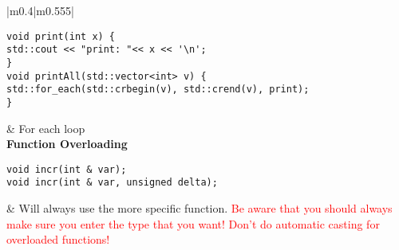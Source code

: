 \documentclass[main.tex,fontsize=8pt,paper=a4,paper=portrait,DIV=calc,]{scrartcl}
\begin{document}
\begin{table}[h!]
\begin{tabular}{|m{0.4\linewidth}|m{0.555\linewidth}|}
\hline
\begin{lstlisting}
void print(int x) {
std::cout << "print: "<< x << '\n';
}
void printAll(std::vector<int> v) {
std::for_each(std::crbegin(v), std::crend(v), print);
}
\end{lstlisting}
& For each loop\\
\hline
\textbf{Function Overloading}\newline
\begin{lstlisting}
void incr(int & var);
void incr(int & var, unsigned delta);
\end{lstlisting}
& Will always use the more specific function.\newline
\textcolor{red}{Be aware that you should always make sure you enter the type that you want!\newline
Don't do automatic casting for overloaded functions!}\\
\hline
\end{tabular}
\end{table}
\pagebreak
\end{document}
